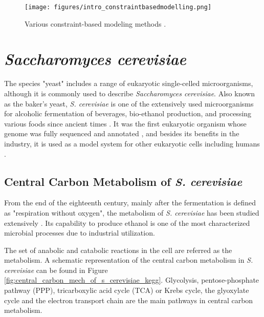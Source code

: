 \begin{figure}[H]
\begin{center}
\texttt{[image: figures/intro\_constraintbasedmodelling.png]}
\end{center}
\caption[Various constraint-based modeling methods]{Various constraint-based modeling methods \cite{lewis2012constraining}.}
\label{fig:intro_constraintbasedmodelling}
\end{figure}



\section{\emph{Saccharomyces cerevisiae}}

The species "yeast" includes a range of eukaryotic single-celled microorganisms, although it is commonly used to describe \emph{Saccharomyces cerevisiae}. Also known as the baker's yeast, \emph{S. cerevisiae} is one of the extensively used microorganisms for alcoholic fermentation of beverages, bio-ethanol production, and processing various foods since ancient times \cite{gelinas2009inventions}. It was the first eukaryotic organism whose genome was fully sequenced and annotated \cite{goffeau1997multidrug}, and besides its benefits in the industry, it is used as a model system for other eukaryotic cells including humans \cite{dujon1996yeast, botstein1997yeast}.

\subsection{Central Carbon Metabolism of \emph{S. cerevisiae}}
From the end of the eighteenth century, mainly after the fermentation is defined as "respiration without oxygen", the metabolism of \emph{S. cerevisiae} has been studied extensively \cite{barnett1998history, barnett2000history}. Its capability to produce ethanol is one of the most characterized microbial processes due to industrial utilization.

The set of anabolic and catabolic reactions in the cell are referred as the metabolism. A schematic representation of the central carbon metabolism in \emph{S. cerevisiae} can be found in Figure \ref{fig:central_carbon_mech_of_s_cerevisiae_kegg}. Glycolysis, pentose-phosphate pathway (PPP), tricarboxylic acid cycle (TCA) or Krebs cycle, the glyoxylate cycle and the electron transport chain are the main pathways in central carbon metabolism.


